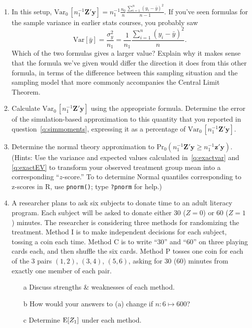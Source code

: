 \documentclass{article}
\begin{document}
\begin{enumerate}
\item In this setup, $\mathrm{Var}_{0}\, [n_{1}^{-1}\mathbf{Z}'\mathbf{y}]  = n_{1}^{-1}
  \frac{n_{0}}{n} \frac{\sum_{i=1}^{n} (y_{i} - \bar y)^{2}}{n-1} $.
  If you've seen formulas for the sample variance in earlier stats
  courses, you probably saw
  $$
  \mathrm{Var} \left[\bar{y}\right] = \frac{\sigma_{y}^{2}}{n_{1}} = \frac{1}{n_{1}}
  \frac{\sum_{i=1}^{n} (y_{i} - \bar y)^{2}}{n} .
  $$
Which of the two formulas gives a larger value?  Explain why it makes
sense that the formula we've given would differ the direction it does
from this other formula, in terms of the difference between this
sampling situation and the sampling model that more commonly
accompanies the Central Limit Theorem.
\item Calculate $\mathrm{Var}_{0}\, [n_{1}^{-1}\mathbf{Z}'\mathbf{y}]$ using the appropriate
  formula.   Determine the error of the simulation-based
  approximation to this quantity that you reported in question~\ref{q:simmoments},
  expressing it as a percentage of $\mathrm{Var}_{0}\,[ n_{1}^{-1}\mathbf{Z}'\mathbf{y}]$. \label{q:exactvar}
\item Determine the normal theory approximation to
  $\mathrm{Pr}_{0}(n_{1}^{-1}\mathbf{Z}'\mathbf{y} \geq
  n_{1}^{-1}\mathbf{z}'\mathbf{y} ) $.  (Hints: Use the variance and
  expected values calculated in~\ref{q:exactvar} and \ref{q:exactEV} to transform your
  observed treatment group mean into a corresponding ``$z$-score.'' 
  To to determine Normal quantiles corresponding to z-scores in R, use
  \texttt{pnorm()}; type \texttt{?pnorm} for help.)
\item %
A researcher plans to ask six subjects to donate time to an adult
literacy program. Each subject will be asked to donate either 30
($Z=0$) or 60 ($Z=1$)
minutes. The researcher is considering three methods for randomizing
the treatment. Method I is to make independent decisions for each
subject, tossing a coin each time. Method C is to
write ``30'' and ``60'' on three playing cards each, and then shuffle
the six cards. Method P tosses one coin for each of the 3 pairs
$(1,2)$, $(3,4)$, $(5,6)$, asking for 30 (60) minutes from exactly one
member of each pair. 
  \begin{minipage}{.45\linewidth}
\begin{itemize}
\item[a] Discuss strengths \& weaknesses of each method.
\item[b] How would your answers to (a) change if $n: 6 \mapsto 600$?
\item[c] Determine $\mathrm{E}[  Z_{1} ]$  under each method.

\end{itemize}
\end{minipage}
\end{enumerate}
\end{document}
